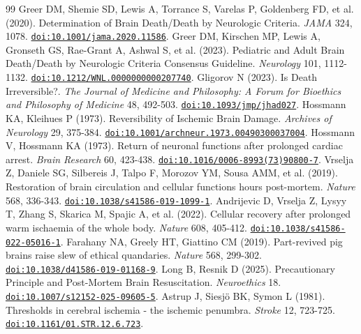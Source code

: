 \documentclass[11pt]{article}
\begin{document}
\begin{thebibliography}{99}
\small
\setlength{\itemsep}{1pt}
 Greer DM, Shemie SD, Lewis A, Torrance S, Varelas P, Goldenberg FD, et al. (2020). Determination of Brain Death/Death by Neurologic Criteria. \emph{JAMA} 324, 1078. \href{https://doi.org/10.1001/jama.2020.11586}{\nolinkurl{doi:10.1001/jama.2020.11586}}.
 Greer DM, Kirschen MP, Lewis A, Gronseth GS, Rae-Grant A, Ashwal S, et al. (2023). Pediatric and Adult Brain Death/Death by Neurologic Criteria Consensus Guideline. \emph{Neurology} 101, 1112-1132. \href{https://doi.org/10.1212/WNL.0000000000207740}{\nolinkurl{doi:10.1212/WNL.0000000000207740}}.
 Gligorov N (2023). Is Death Irreversible?. \emph{The Journal of Medicine and Philosophy: A Forum for Bioethics and Philosophy of Medicine} 48, 492-503. \href{https://doi.org/10.1093/jmp/jhad027}{\nolinkurl{doi:10.1093/jmp/jhad027}}.
 Hossmann KA, Kleihues P (1973). Reversibility of Ischemic Brain Damage. \emph{Archives of Neurology} 29, 375-384. \href{https://doi.org/10.1001/archneur.1973.00490300037004}{\nolinkurl{doi:10.1001/archneur.1973.00490300037004}}.
 Hossmann V, Hossmann KA (1973). Return of neuronal functions after prolonged cardiac arrest. \emph{Brain Research} 60, 423-438. \href{https://doi.org/10.1016/0006-8993(73)90800-7}{\nolinkurl{doi:10.1016/0006-8993(73)90800-7}}.
 Vrselja Z, Daniele SG, Silbereis J, Talpo F, Morozov YM, Sousa AMM, et al. (2019). Restoration of brain circulation and cellular functions hours post-mortem. \emph{Nature} 568, 336-343. \href{https://doi.org/10.1038/s41586-019-1099-1}{\nolinkurl{doi:10.1038/s41586-019-1099-1}}.
 Andrijevic D, Vrselja Z, Lysyy T, Zhang S, Skarica M, Spajic A, et al. (2022). Cellular recovery after prolonged warm ischaemia of the whole body. \emph{Nature} 608, 405-412. \href{https://doi.org/10.1038/s41586-022-05016-1}{\nolinkurl{doi:10.1038/s41586-022-05016-1}}.
 Farahany NA, Greely HT, Giattino CM (2019). Part-revived pig brains raise slew of ethical quandaries. \emph{Nature} 568, 299-302. \href{https://doi.org/10.1038/d41586-019-01168-9}{\nolinkurl{doi:10.1038/d41586-019-01168-9}}.
 Long B, Resnik D (2025). Precautionary Principle and Post-Mortem Brain Resuscitation. \emph{Neuroethics} 18. \href{https://doi.org/10.1007/s12152-025-09605-5}{\nolinkurl{doi:10.1007/s12152-025-09605-5}}.
 Astrup J, Siesjö BK, Symon L (1981). Thresholds in cerebral ischemia - the ischemic penumbra. \emph{Stroke} 12, 723-725. \href{https://doi.org/10.1161/01.STR.12.6.723}{\nolinkurl{doi:10.1161/01.STR.12.6.723}}.

\end{thebibliography}
\end{document}
